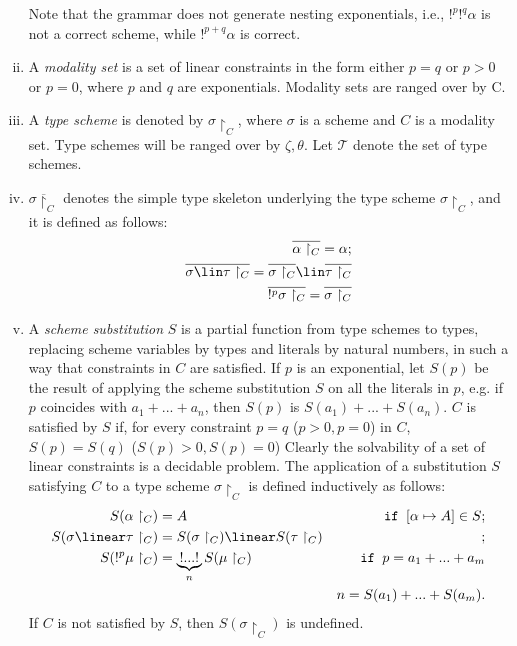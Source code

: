 \begin{defi}
\begin{enumerate}[i)]
 Note that the grammar does not generate nesting exponentials, i.e., $!^{p}!^{q}\alpha$ is not a correct scheme, while
 $!^{p+q}\alpha$ is correct. 
\item A \emph{modality set} is a set of linear constraints in the
form either $p=q$ or $p>0$ or $p=0$, where $p$ and $q$ are exponentials. Modality sets are ranged over by C.
\item A \emph{type scheme} is denoted by $\sigma\restriction_{C}$, where $\sigma$ is a scheme 
and $C$ is
a modality set. Type schemes will be ranged over by $\zeta, \theta$. Let $\mathcal{T}$ 
denote the set of type schemes.
  \item $\overline{\sigma \restriction_{C}}$ denotes the simple type skeleton underlying the 
 type scheme $\sigma\restriction_{C}$, and it is defined as follows:
  \begin{align*}
\overline{\alpha\restriction_{C}}=\alpha;\\
\overline{\sigma \lin \tau\restriction_{C}} =\overline{\sigma\restriction_{C}}\lin \overline{\tau\restriction_{C}}\\
 \overline{!^{p}\sigma\restriction_{C}} = \overline{\sigma\restriction_{C}}\\
\end{align*}
\item A \emph{scheme substitution} $S$ is a partial function from type schemes
  to types, replacing scheme variables by types and literals by
  natural numbers, in such a way that constraints in $C$ are satisfied. If $p$ is an exponential,
  let $S(p)$ be the result of applying the scheme substitution $S$ on all the literals in $p$, e.g. 
 if $p$ coincides with $a_{1}+...+a_{n}$, then $S(p)$ is $S(a_1)+...+S(a_n)$. 
 $C$ is satisfied by $S$ if, for every constraint
 $p=q$ ($p>0, p=0$) in $C$, $S(p)=S(q)$ ($S(p)>0, S(p)=0$)
Clearly the solvability of a
set of linear constraints is a decidable problem. 
The application of a substitution 
  $S$ satisfying $C$ to a type scheme $\sigma\restriction_C$ is defined inductively as follows:
  \begin{align*}
    S (\alpha\restriction_C) &=A &\texttt{ if } [\alpha \mapsto A]\in S;\\
    S (\sigma \linear \tau\restriction_C)& =S (\sigma\restriction_C) \linear S (\tau\restriction_C) &;\\
    S (!^{p}\mu\restriction_C)&=\underbrace{!...!}_n S (\mu\restriction_C) & 
    \texttt{ if } p=a_{1}+...+a_{m}\\
    & & n=S(a_1)+...+S(a_m).
  \end{align*}
   If $C$ is not satisfied by $S$, then $S(\sigma\restriction_C)$ is undefined.
\end{enumerate}
\end{defi}

